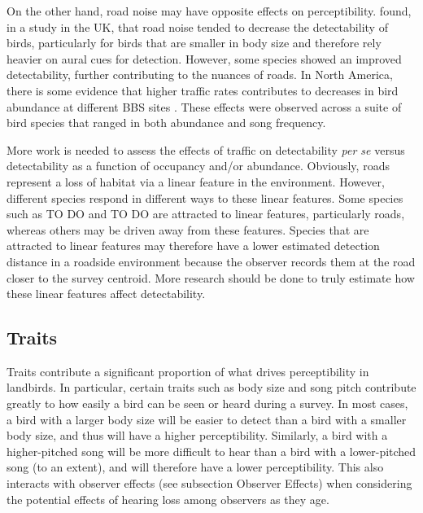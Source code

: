 \par On the other hand, road noise may have opposite effects on perceptibility.
\citet{cooke_road_2020} found, in a study in the UK, that road noise tended to decrease the detectability of birds, particularly for birds that are smaller in body size and therefore rely heavier on aural cues for detection.
However, some species showed an improved detectability, further contributing to the nuances of roads.
In North America, there is some evidence that higher traffic rates contributes to decreases in bird abundance at different BBS sites \citep{griffith_traffic_2010}.
These effects were observed across a suite of bird species that ranged in both abundance and song frequency.

\par More work is needed to assess the effects of traffic on detectability \textit{per se} versus detectability as a function of occupancy and/or abundance.
Obviously, roads represent a loss of habitat via a linear feature in the environment.
However, different species respond in different ways to these linear features.
Some species such as TO DO and TO DO are attracted to linear features, particularly roads, whereas others may be driven away from these features.
Species that are attracted to linear features may therefore have a lower estimated detection distance in a roadside environment because the observer records them at the road closer to the survey centroid.
More research should be done to truly estimate how these linear features affect detectability.


\subsection{Traits}

\par Traits contribute a significant proportion of what drives perceptibility in landbirds.
In particular, certain traits such as body size and song pitch contribute greatly to how easily a bird can be seen or heard during a survey.
In most cases, a bird with a larger body size will be easier to detect than a bird with a smaller body size, and thus will have a higher perceptibility.
Similarly, a bird with a higher-pitched song will be more difficult to hear than a bird with a lower-pitched song (to an extent), and will therefore have a lower perceptibility.
This also interacts with observer effects (see subsection Observer Effects) when considering the potential effects of hearing loss among observers as they age.

